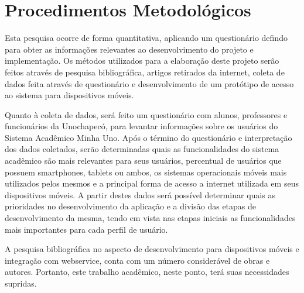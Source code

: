 \section{Procedimentos Metodológicos}

Esta pesquisa ocorre de forma quantitativa, aplicando um questionário defindo para obter as informações relevantes ao desenvolvimento do projeto e implementação. Os métodos utilizados para a elaboração deste projeto serão feitos através de pesquisa bibliográfica, artigos retirados da internet, coleta de dados feita através de questionário e desenvolvimento de um protótipo de acesso ao sistema para dispositivos móveis.

Quanto à coleta de dados, será feito um questionário com alunos, professores e funcionários da Unochapecó, para levantar informações sobre os usuários do Sistema Acadêmico Minha Uno.  Após o término do questionário e interpretação dos dados coletados, serão determinadas quais as funcionalidades do sistema acadêmico são mais relevantes para seus usuários, percentual de usuários que possuem smartphones, tablets ou ambos, os sistemas operacionais móveis mais utilizados pelos mesmos e a principal forma de acesso a internet utilizada em seus dispositivos móveis. A partir destes dados será possível determinar quais as prioridades no desenvolvimento da aplicação e a divisão das etapas de desenvolvimento da mesma, tendo em vista nas etapas iniciais as funcionalidades mais importantes para cada perfil de usuário.

A pesquisa bibliográfica no aspecto de desenvolvimento para dispositivos móveis e integração com webservice, conta com um número considerável de obras e autores. Portanto, este trabalho acadêmico, neste ponto, terá suas necessidades supridas.


